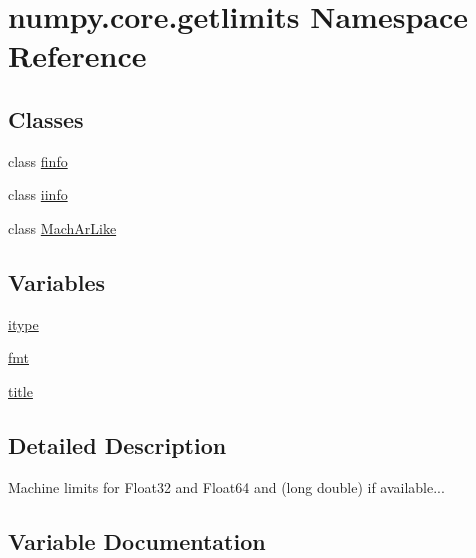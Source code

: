 \hypertarget{namespacenumpy_1_1core_1_1getlimits}{}\section{numpy.\+core.\+getlimits Namespace Reference}
\label{namespacenumpy_1_1core_1_1getlimits}
\subsection*{Classes}
\begin{DoxyCompactItemize}
\item 
class \hyperlink{classnumpy_1_1core_1_1getlimits_1_1finfo}{finfo}
\item 
class \hyperlink{classnumpy_1_1core_1_1getlimits_1_1iinfo}{iinfo}
\item 
class \hyperlink{classnumpy_1_1core_1_1getlimits_1_1MachArLike}{Mach\+Ar\+Like}
\end{DoxyCompactItemize}
\subsection*{Variables}
\begin{DoxyCompactItemize}
\item 
\hyperlink{namespacenumpy_1_1core_1_1getlimits_ab196e4c79fcaa76b0c82a1703fdcbd46}{itype}
\item 
\hyperlink{namespacenumpy_1_1core_1_1getlimits_a7dcb9dc7b8f54864c08024ad445e5e92}{fmt}
\item 
\hyperlink{namespacenumpy_1_1core_1_1getlimits_a423bb13cefe87b6779f3511eed84acda}{title}
\end{DoxyCompactItemize}


\subsection{Detailed Description}
\begin{DoxyVerb}Machine limits for Float32 and Float64 and (long double) if available...\end{DoxyVerb}
 

\subsection{Variable Documentation}
\mbox{\label{namespacenumpy_1_1core_1_1getlimits_a7dcb9dc7b8f54864c08024ad445e5e92}} 
